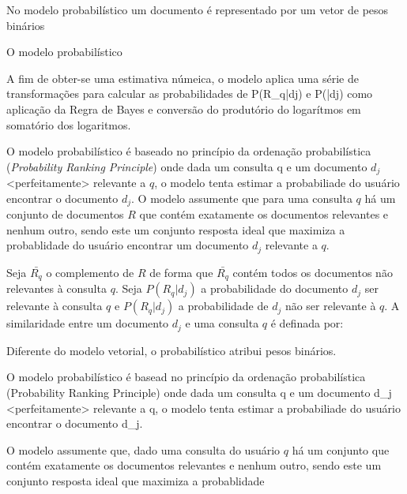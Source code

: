 No modelo probabilístico um documento é representado por um vetor de pesos binários 



O modelo probabilístico

A fim de obter-se uma estimativa númeica, o modelo aplica uma série de transformações para calcular as probabilidades de P(R_q|dj) e P(|dj) como 
aplicação da Regra de Bayes 
e conversão do produtório do logarítmos em somatório dos logaritmos.











O modelo probabilístico é baseado no princípio da ordenação probabilística (\textit{Probability Ranking Principle}) onde dada um consulta q e um documento $d_j$ <perfeitamente> relevante a $q$, o modelo tenta estimar a probabiliade do usuário encontrar o documento $d_j$. O modelo assumente que para uma consulta $q$ há um conjunto de documentos $R$ que contém exatamente os documentos relevantes e nenhum outro, sendo este um conjunto resposta ideal que maximiza a probablidade do usuário encontrar um documento $d_j$ relevante a $q$. 

Seja $\bar{R_q}$ o complemento de $R$ de forma que $\bar{R_q}$ contém todos os documentos não relevantes à consulta $q$. Seja $P(R_q|d_j)$ a probabilidade do documento $d_j$ ser relevante à consulta $q$ e $P(R_q|d_j)$ a probabilidade de $d_j$ não ser relevante à $q$. A similaridade entre um documento $d_j$ e uma consulta $q$ é definada por:









Diferente do modelo vetorial, o probabilístico atribui pesos binários.

O modelo probabilístico é basead no princípio da ordenação probabilística (Probability Ranking Principle) onde dada um consulta q e um documento d_j <perfeitamente> relevante a q, o modelo tenta estimar a probabiliade do usuário encontrar o documento d_j. 


O modelo assumente que, dado uma consulta do usuário $q$ há um conjunto que contém exatamente os documentos relevantes e nenhum outro, sendo este um conjunto resposta ideal que maximiza a probablidade 



















